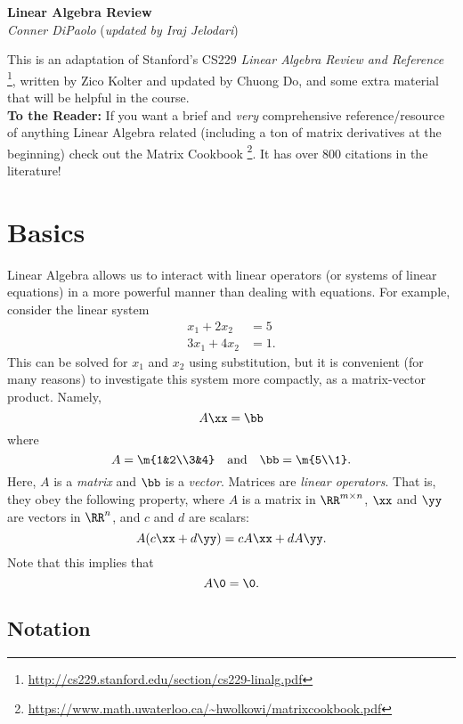 \documentclass{article}
\begin{document}
\begin{center}
  \Large\textbf{Linear Algebra Review}\\
  \large\textit{Conner DiPaolo} (\large\textit{updated by Iraj Jelodari})
\end{center}
\vspace*{1em}

\tableofcontents
\vspace{1em}

This is an adaptation of Stanford's CS229 \textit{Linear Algebra Review and Reference}
\footnote{\url{http://cs229.stanford.edu/section/cs229-linalg.pdf}}, written by Zico Kolter
and updated by Chuong Do, and some extra material that will be helpful in the
course.\\

\textbf{To the Reader:} If you want a brief and \textit{very} comprehensive reference/resource
of anything Linear Algebra related (including a ton of matrix derivatives at the beginning)
check out the Matrix Cookbook \footnote{\url{https://www.math.uwaterloo.ca/~hwolkowi/matrixcookbook.pdf}}.
It has over 800 citations in the literature!

\section{Basics}

Linear Algebra allows us to interact with linear operators (or systems
of linear equations) in a more powerful manner than dealing with equations.
For example, consider the linear system
\begin{align*}
    x_1 + 2x_2 &= 5\\
    3x_1 + 4x_2 &= 1.
\end{align*}
This can be solved for $x_1$ and $x_2$ using substitution, but it is
convenient (for many reasons) to investigate this system more compactly,
as a matrix-vector product. Namely,
\[
    A\xx = \bb
\]
where
\[
    A = \m{1&2\\3&4} \quad\text{and}\quad \bb = \m{5\\1}.
\]
Here, $A$ is a \textit{matrix} and $\bb$ is a \textit{vector}. Matrices are
\textit{linear operators}. That is, they obey the following property, where
$A$ is a matrix in $\RR^{m\times n}$, $\xx$ and $\yy$ are vectors in $\RR^n$,
and $c$ and $d$ are scalars:
\[
    A(c\xx+d\yy) = cA\xx + dA\yy.
\]
Note that this implies that
\[
    A\0 = \0.
\]

\subsection{Notation}
\end{document}

